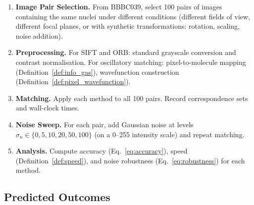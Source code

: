 \documentclass[11pt,twocolumn,a4paper]{article}
\begin{document}
\begin{enumerate}[label=\textbf{Step \arabic*}:]
    \item \textbf{Image Pair Selection.} From BBBC039, select 100 pairs of images containing the same nuclei under different conditions (different fields of view, different focal planes, or with synthetic transformations: rotation, scaling, noise addition).

    \item \textbf{Preprocessing.} For SIFT and ORB: standard grayscale conversion and contrast normalisation. For oscillatory matching: pixel-to-molecule mapping (Definition~\ref{def:info_gas}), wavefunction construction (Definition~\ref{def:pixel_wavefunction}).

    \item \textbf{Matching.} Apply each method to all 100 pairs. Record correspondence sets and wall-clock times.

    \item \textbf{Noise Sweep.} For each pair, add Gaussian noise at levels $\sigma_n \in \{0, 5, 10, 20, 50, 100\}$ (on a 0--255 intensity scale) and repeat matching.

    \item \textbf{Analysis.} Compute accuracy (Eq.~\eqref{eq:accuracy}), speed (Definition~\ref{def:speed}), and noise robustness (Eq.~\eqref{eq:robustness}) for each method.
\end{enumerate}

\subsection{Predicted Outcomes}
\end{document}
